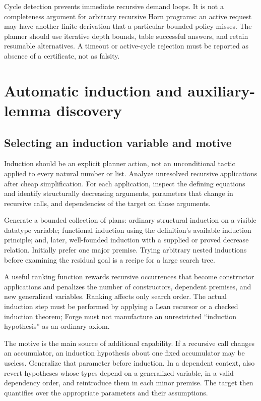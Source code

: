 \documentclass[11pt,a4paper]{article}
\begin{document}
Cycle detection prevents immediate recursive demand loops. It is not a
completeness argument for arbitrary recursive Horn programs: an active request
may have another finite derivation that a particular bounded policy misses.
The planner should use iterative depth bounds, table successful answers, and
retain resumable alternatives. A timeout or active-cycle rejection must be
reported as absence of a certificate, not as falsity.

\section{Automatic induction and auxiliary-lemma discovery}
\label{sec:induction}

\subsection{Selecting an induction variable and motive}
Induction should be an explicit planner action, not an unconditional tactic
applied to every natural number or list. Analyze unresolved recursive
applications after cheap simplification. For each application, inspect the
defining equations and identify structurally decreasing arguments, parameters
that change in recursive calls, and dependencies of the target on those
arguments.

Generate a bounded collection of plans: ordinary structural induction on a
visible datatype variable; functional induction using the definition's available
induction principle; and, later, well-founded induction with a supplied or
proved decrease relation. Initially prefer one major premise. Trying arbitrary
nested inductions before examining the residual goal is a recipe for a large
search tree.

A useful ranking function rewards recursive occurrences that become constructor
applications and penalizes the number of constructors, dependent premises, and
new generalized variables. Ranking affects only search order. The actual
induction step must be performed by applying a Lean recursor or a checked
induction theorem; Forge must not manufacture an unrestricted ``induction
hypothesis'' as an ordinary axiom.

The motive is the main source of additional capability. If a recursive call
changes an accumulator, an induction hypothesis about one fixed accumulator may
be useless. Generalize that parameter before induction. In a dependent context,
also revert hypotheses whose types depend on a generalized variable, in a
valid dependency order, and reintroduce them in each minor premise. The target
then quantifies over the appropriate parameters and their assumptions.
\end{document}
